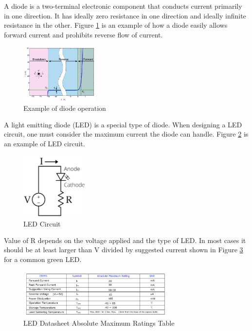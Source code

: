 \documentclass{article}
\begin{document}
A diode is a two-terminal electronic component that conducts current primarily in one direction. It has ideally zero resistance in one direction and ideally infinite resistance in the other. Figure \ref{fig:diodeop} is an example of how a diode easily allows forward current and prohibits reverse flow of current. 

\begin{figure}[!h]
	\center
	\includegraphics[width=0.35\textwidth, keepaspectratio]{diodeop}
	\caption{Example of diode operation}
	\label{fig:diodeop}
\end{figure}

A light emitting diode (LED) is a special type of diode. When designing a LED circuit, one must consider the maximum current the diode can handle. Figure \ref{fig:LEDcct} is an example of LED circuit. 

\begin{figure}[!h]
	\center
	\includegraphics[width=0.3\textwidth, keepaspectratio]{LEDcct}
	\caption{LED Circuit}
	\label{fig:LEDcct}
\end{figure}

Value of R depends on the voltage applied and the type of LED. In most cases it should be at least larger than V divided by suggested current shown in Figure \ref{fig:LEDds} for a common green LED. 

\begin{figure}[!h]
	\center
	\includegraphics[width=0.7\textwidth, keepaspectratio]{LEDds}
	\caption{LED Datasheet Absolute Maximum Ratings Table}
	\label{fig:LEDds}
\end{figure}
\end{document}
